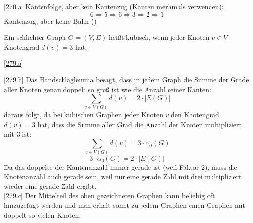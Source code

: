 \documentclass[a4paper, 12pt, margins=2cm]{homework}
\begin{document}
  \begin{solution} \hfill

    \ref{270.a}
      Kantenfolge, aber kein Kantenzug (Kanten merhmals verwenden): 
      $$6 \Rightarrow 5 \Rightarrow 6 \Rightarrow 3 \Rightarrow 2 \Rightarrow 1$$
      Kantenzug, aber keine Bahn ()
  \end{solution}


  \begin{problem}
    Ein schlichter Graph $G = (V, E)$ heißt kubisch, wenn jeder Knoten $v \in V$
    Knotengrad $d(v) = 3$ hat.
  \end{problem}
  \begin{solution} \hfill

      \ref{279.a} \hfill

        \begin{center}
          \def\svgwidth{5cm}
          
        \end{center}

      \ref{279.b} \hfill
        Das Handschlaglemma besagt, dass in jedem Graph die Summe der Grade aller
        Knoten genau doppelt so groß ist wie die Anzahl seiner Kanten:
        \[ \sum_{v\in V(G)}{d(v)} = 2 \cdot |E(G)| \]
        daraus folgt, da bei kubischen Graphen jeder Knoten $v$ den Knotengrad
        $d(v) = 3$ hat, dass die Summe aller Grad die Anzahl der Knoten multipliziert
        mit 3 ist: 
        \[ \sum_{v\in V(G)}{d(v)} = 3 \cdot \alpha_0(G) \]
        \[ 3\cdot \alpha_0(G) = 2\cdot |E(G)| \]
        Da das doppelte der Kantenanzahl immer gerade ist (weil Faktor 2), muss
        die Knotenanzahl auch gerade sein, weil nur eine gerade Zahl mit drei
        multipliziert wieder eine gerade Zahl ergibt. \\

      \ref{279.c} \hfill
        Der Mittelteil des oben gezeichneten Graphen kann beliebig oft hinzugefügt
        werden und man erhält somit zu jedem Graphen einen Graphen mit doppelt so
        vielen Knoten.

  \end{solution}
\end{document}
